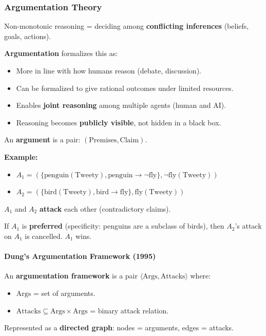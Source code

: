 \bigseparator

\subsubsection{Argumentation Theory}

\begin{defbox}
Non-monotonic reasoning = deciding among \textbf{conflicting inferences} (beliefs, goals, actions).

\textbf{Argumentation} formalizes this as:
\begin{itemize}
  \item More in line with how humans reason (debate, discussion).
  \item Can be formalized to give rational outcomes under limited resources.
  \item Enables \textbf{joint reasoning} among multiple agents (human and AI).
  \item Reasoning becomes \textbf{publicly visible}, not hidden in a black box.
\end{itemize}
\end{defbox}

\begin{defbox}
An \textbf{argument} is a pair: $(\text{Premises}, \text{Claim})$.

\textbf{Example:}
\begin{itemize}
  \item $A_1 = (\{\text{penguin}(\text{Tweety}), \text{penguin} \to \neg\text{fly}\}, \neg\text{fly}(\text{Tweety}))$
  \item $A_2 = (\{\text{bird}(\text{Tweety}), \text{bird} \to \text{fly}\}, \text{fly}(\text{Tweety}))$
\end{itemize}

$A_1$ and $A_2$ \textbf{attack} each other (contradictory claims).

If $A_1$ is \textbf{preferred} (specificity: penguins are a subclass of birds), then $A_2$'s attack on $A_1$ is cancelled. $A_1$ wins.
\end{defbox}

\separator

\paragraph*{Dung's Argumentation Framework (1995)}

\begin{defbox}
An \textbf{argumentation framework} is a pair $\langle \text{Args}, \text{Attacks} \rangle$ where:
\begin{itemize}
  \item $\text{Args}$ = set of arguments.
  \item $\text{Attacks} \subseteq \text{Args} \times \text{Args}$ = binary attack relation.
\end{itemize}

Represented as a \textbf{directed graph}: nodes = arguments, edges = attacks.
\end{defbox}

